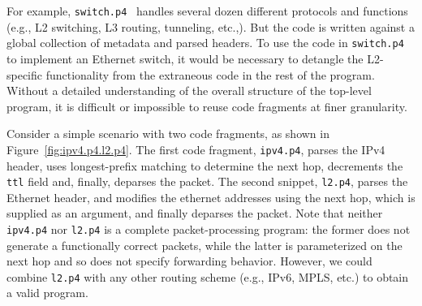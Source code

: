 
For example, \texttt{switch.p4}~\cite{switch.p4} handles several dozen
different protocols and functions (e.g., L2 switching, L3 routing,
tunneling, etc.,). But the code is written against a global collection
of metadata and parsed headers. To use the code in 
\texttt{switch.p4} to implement an Ethernet switch, it would be
necessary to detangle the L2-specific functionality from the
extraneous code in the rest of the program. Without a detailed
understanding of the overall structure of the top-level program, it is
difficult or impossible to reuse code fragments at finer granularity.

Consider a simple scenario with two code fragments, as shown in Figure~\ref{fig:ipv4.p4.l2.p4}.
The first code fragment, \texttt{ipv4.p4}, parses the IPv4 header, uses
longest-prefix matching to determine the next hop, decrements the
\texttt{ttl} field and, finally, deparses the packet. The second
snippet, \texttt{l2.p4}, parses the Ethernet header, and modifies the
ethernet addresses using the next hop, which is supplied as an
argument, and finally deparses the packet. Note that neither
\texttt{ipv4.p4} nor \texttt{l2.p4} is a complete packet-processing
program: the former does not generate a functionally correct packets,
while the latter is parameterized on the next hop and so does not
specify forwarding behavior. However, we could combine \texttt{l2.p4}
with any other routing scheme (e.g., IPv6, MPLS, etc.) to obtain a
valid program. 

